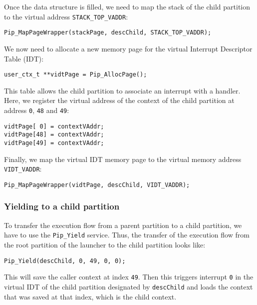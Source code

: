 \documentclass[10pt,a4paper,titlepage]{refart}
\begin{document}
Once the data structure is filled, we need to map the stack of the child
partition to the virtual address \texttt{STACK\_TOP\_VADDR}:

\begin{lstlisting}[style=CStyle]
Pip_MapPageWrapper(stackPage, descChild, STACK_TOP_VADDR);
\end{lstlisting}

We now need to allocate a new memory page for the virtual Interrupt Descriptor
Table (IDT):

\begin{lstlisting}[style=CStyle]
user_ctx_t **vidtPage = Pip_AllocPage();
\end{lstlisting}

This table allows the child partition to associate an interrupt with a handler.
Here, we register the virtual address of the context of the child partition at
address \texttt{0}, \texttt{48} and \texttt{49}:

\begin{lstlisting}[style=CStyle]
vidtPage[ 0] = contextVAddr;
vidtPage[48] = contextVAddr;
vidtPage[49] = contextVAddr;
\end{lstlisting}

Finally, we map the virtual IDT memory page to the virtual memory address
\texttt{VIDT\_VADDR}:

\begin{lstlisting}[style=CStyle]
Pip_MapPageWrapper(vidtPage, descChild, VIDT_VADDR);
\end{lstlisting}

\subsubsection{Yielding to a child partition}

To transfer the execution flow from a parent partition to a child partition, we
have to use the \texttt{Pip\_Yield} service. Thus, the transfer of the execution
flow from the root partition of the launcher to the child partition looks like:

\begin{lstlisting}[style=CStyle]
Pip_Yield(descChild, 0, 49, 0, 0);
\end{lstlisting}

This will save the caller context at index \texttt{49}. Then this triggers
interrupt \texttt{0} in the virtual IDT of the child partition designated by
\texttt{descChild} and loads the context that was saved at that index, which is
the child context.
\end{document}
